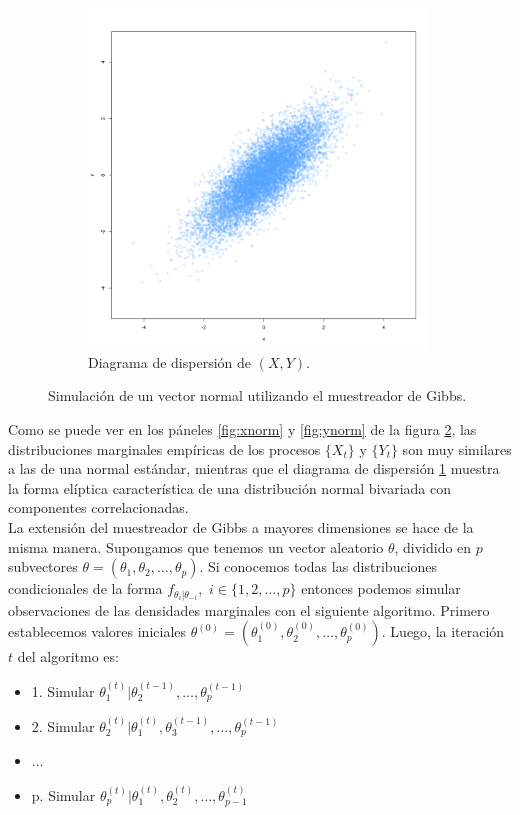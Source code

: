 \documentclass[11pt,a4paper]{article}
\begin{document}
\begin{figure}
    \vspace{0.2cm}
    \begin{subfigure}[t]{\textwidth}
    \centering
        \includegraphics[width=9cm]{bivnorm.png} 
        \caption{Diagrama de dispersión de $(X, Y)$.} \label{fig:bivnorm}
    \end{subfigure}
    \caption{Simulación de un vector normal utilizando el muestreador de Gibbs.}
    \label{fig:gs_norm}
\end{figure}

Como se puede ver en los páneles \ref{fig:xnorm} y \ref{fig:ynorm} de la figura \ref{fig:gs_norm}, las distribuciones marginales empíricas de los procesos $\lbrace X_t \rbrace$ y $\lbrace Y_t \rbrace$ son muy similares a las de una normal estándar, mientras que el diagrama de dispersión \ref{fig:bivnorm} muestra la forma elíptica característica de una distribución normal bivariada con componentes correlacionadas.\\

La extensión del muestreador de Gibbs a mayores dimensiones se hace de la misma manera. Supongamos que tenemos un vector aleatorio $\theta$, dividido en $p$ subvectores $\theta = (\theta_1, \theta_2, \dots, \theta_p)$. Si conocemos todas las distribuciones condicionales de la forma $f_{\theta_i | \theta_{-i}},$ $i \in \lbrace 1, 2, \dots, p\rbrace$ entonces podemos simular observaciones de las densidades marginales con el siguiente algoritmo. Primero establecemos valores iniciales $\theta^{(0)} = (\theta_1^{(0)}, \theta_2^{(0)}, \dots, \theta_p^{(0)})$. Luego, la iteración $t$ del algoritmo es:

\begin{itemize}
\item[] 1. Simular $\theta_1^{(t)} | \theta_2^{(t-1)}, \dots, \theta_p^{(t-1)}$
\item[] 2. Simular $\theta_2^{(t)} | \theta_1^{(t)}, \theta_3^{(t-1)}, \dots, \theta_p^{(t-1)}$
\item[] $\dots$
\item[] p. Simular $\theta_p^{(t)} | \theta_1^{(t)}, \theta_2^{(t)}, \dots, \theta_{p-1}^{(t)}$
\end{itemize}
\end{document}
